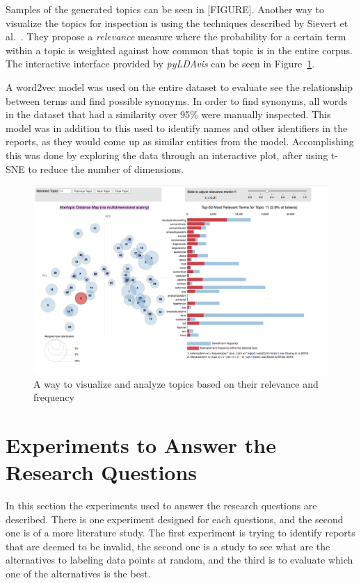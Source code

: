Samples of the generated topics can be seen in [FIGURE].
Another way to visualize the topics for inspection is using the techniques described by Sievert et al\@.~\cite{sievert2014ldavis}.
They propose a \textit{relevance} measure where the probability for a certain term within a topic is weighted against how common that topic is in the entire corpus.
The interactive interface provided by \textit{pyLDAvis} can be seen in Figure~\ref{fig:ldavis-sample}.

A word2vec model was used on the entire dataset to evaluate see the relationship between terms and find possible synonyms.
In order to find synonyms, all words in the dataset that had a similarity over 95\% were manually inspected.
This model was in addition to this used to identify names and other identifiers in the reports, as they would come up as similar entities from the model.
Accomplishing this was done by exploring the data through an interactive plot, after using t-SNE to reduce the number of dimensions.

\begin{figure}
    \centering
    \includegraphics[scale=0.3]{figures/ldavis-sample.png}
    \caption{A way to visualize and analyze topics based on their relevance and frequency}
    \label{fig:ldavis-sample}
\end{figure}

\section{Experiments to Answer the Research Questions}
In this section the experiments used to answer the research questions are described.
There is one experiment designed for each questions, and the second one is of a more literature study.
The first experiment is trying to identify reports that are deemed to be invalid, the second one is a study to see what are the alternatives to labeling data points at random, and the third is to evaluate which one of the alternatives is the best.

